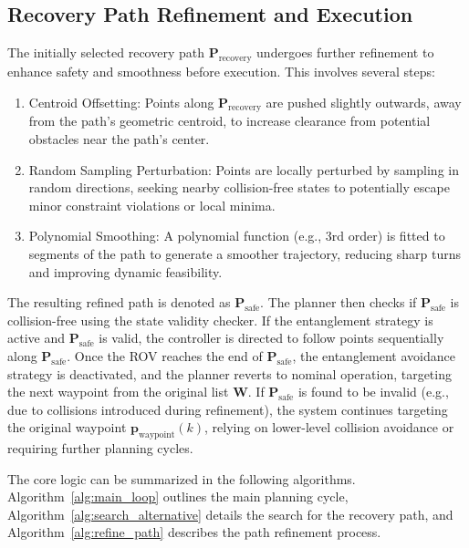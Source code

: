 \subsection{Recovery Path Refinement and Execution}
The initially selected recovery path \( \mathbf{P}_{\text{recovery}} \) undergoes further refinement to enhance safety and smoothness before execution. This involves several steps:
\begin{enumerate}
    \item Centroid Offsetting: Points along \( \mathbf{P}_{\text{recovery}} \) are pushed slightly outwards, away from the path's geometric centroid, to increase clearance from potential obstacles near the path's center.
    \item Random Sampling Perturbation: Points are locally perturbed by sampling in random directions, seeking nearby collision-free states to potentially escape minor constraint violations or local minima.
    \item Polynomial Smoothing: A polynomial function (e.g., 3rd order) is fitted to segments of the path to generate a smoother trajectory, reducing sharp turns and improving dynamic feasibility.
\end{enumerate}
The resulting refined path is denoted as \( \mathbf{P}_{\text{safe}} \). The planner then checks if \( \mathbf{P}_{\text{safe}} \) is collision-free using the state validity checker. If the entanglement strategy is active and \( \mathbf{P}_{\text{safe}} \) is valid, the controller is directed to follow points sequentially along \( \mathbf{P}_{\text{safe}} \). Once the \ac{ROV} reaches the end of \( \mathbf{P}_{\text{safe}} \), the entanglement avoidance strategy is deactivated, and the planner reverts to nominal operation, targeting the next waypoint from the original list \( \mathbf{W} \). If \( \mathbf{P}_{\text{safe}} \) is found to be invalid (e.g., due to collisions introduced during refinement), the system continues targeting the original waypoint \( \mathbf{p}_{\text{waypoint}}(k) \), relying on lower-level collision avoidance or requiring further planning cycles. 

The core logic can be summarized in the following algorithms. Algorithm~\ref{alg:main_loop} outlines the main planning cycle, Algorithm~\ref{alg:search_alternative} details the search for the recovery path, and Algorithm~\ref{alg:refine_path} describes the path refinement process.



























